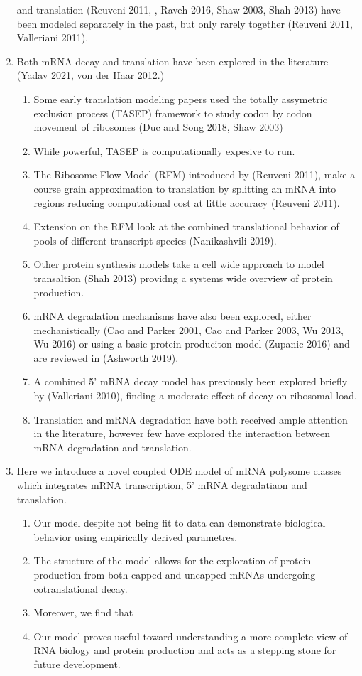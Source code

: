\documentclass[review]{elsarticle}
\begin{document}
\begin{enumerate}
 and translation (Reuveni 2011, , Raveh 2016, Shaw 2003, Shah 2013) have been modeled separately in the past, but only rarely together (Reuveni 2011, Valleriani 2011).
\item Both mRNA decay and translation have been explored in the literature (Yadav 2021, von der Haar 2012.)
\begin{enumerate}	
  \item Some early translation modeling papers used the totally assymetric exclusion process (TASEP) framework to study codon by codon movement of ribosomes (Duc and Song 2018, Shaw 2003)
  \item While powerful, TASEP is computationally expesive to run. 
  \item The Ribosome Flow Model (RFM) introduced by (Reuveni 2011), make a course grain approximation to translation by splitting an mRNA into regions reducing computational cost at little accuracy (Reuveni 2011).
  \item Extension on the RFM look at the combined translational behavior of pools of different transcript species (Nanikashvili 2019).
  \item Other protein synthesis models take a cell wide approach to model transaltion (Shah 2013) providng a systems wide overview of protein production.
  \item mRNA degradation mechanisms have also been explored, either mechanistically (Cao and Parker 2001, Cao and Parker 2003, Wu 2013, Wu 2016) or using a basic protein produciton model (Zupanic 2016) and are reviewed in (Ashworth 2019).
  \item A combined 5' mRNA decay model has previously been explored briefly by (Valleriani 2010), finding a moderate effect of decay on ribosomal load.
  \item Translation and mRNA degradation have both received ample attention in the literature, however few have explored the interaction between mRNA degradation and translation.
\end{enumerate}

\item Here we introduce a novel coupled ODE model of mRNA polysome classes which integrates mRNA transcription, 5' mRNA degradatiaon and translation.
\begin{enumerate}	
  \item Our model despite not being fit to data can demonstrate biological behavior using empirically derived parametres.
  \item The structure of the model allows for the exploration of protein production from both capped and uncapped mRNAs undergoing cotranslational decay.
  \item Moreover, we find that 
  \item Our model proves useful toward understanding a more complete view of RNA biology and protein production and acts as a stepping stone for future development.

\end{enumerate}

\end{enumerate}
\end{document}
